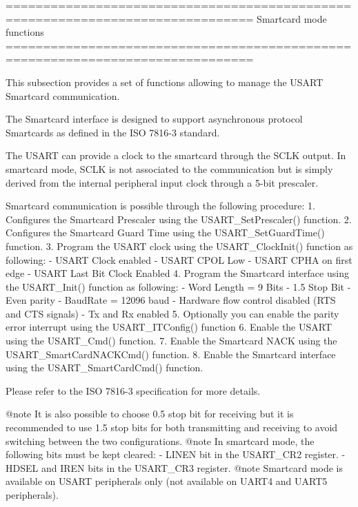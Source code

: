 \begin{DoxyVerb} ===============================================================================
                               Smartcard mode functions
 ===============================================================================  

  This subsection provides a set of functions allowing to manage the USART 
  Smartcard communication.
  
  The Smartcard interface is designed to support asynchronous protocol Smartcards as
  defined in the ISO 7816-3 standard.

  The USART can provide a clock to the smartcard through the SCLK output.
  In smartcard mode, SCLK is not associated to the communication but is simply derived 
  from the internal peripheral input clock through a 5-bit prescaler.

  Smartcard communication is possible through the following procedure:
     1. Configures the Smartcard Prescaler using the USART_SetPrescaler() function.
     2. Configures the Smartcard Guard Time using the USART_SetGuardTime() function.
     3. Program the USART clock using the USART_ClockInit() function as following:
        - USART Clock enabled
        - USART CPOL Low
        - USART CPHA on first edge
        - USART Last Bit Clock Enabled
     4. Program the Smartcard interface using the USART_Init() function as following:
        - Word Length = 9 Bits
        - 1.5 Stop Bit
        - Even parity
        - BaudRate = 12096 baud
        - Hardware flow control disabled (RTS and CTS signals)
        - Tx and Rx enabled
     5. Optionally you can enable the parity error interrupt using the USART_ITConfig()
        function
     6. Enable the USART using the USART_Cmd() function.
     7. Enable the Smartcard NACK using the USART_SmartCardNACKCmd() function.
     8. Enable the Smartcard interface using the USART_SmartCardCmd() function.

  Please refer to the ISO 7816-3 specification for more details.


@note It is also possible to choose 0.5 stop bit for receiving but it is recommended 
      to use 1.5 stop bits for both transmitting and receiving to avoid switching 
      between the two configurations.
@note In smartcard mode, the following bits must be kept cleared:
        - LINEN bit in the USART_CR2 register.
        - HDSEL and IREN bits in the USART_CR3 register.
@note Smartcard mode is available on USART peripherals only (not available on UART4 
      and UART5 peripherals).\end{DoxyVerb}
 

